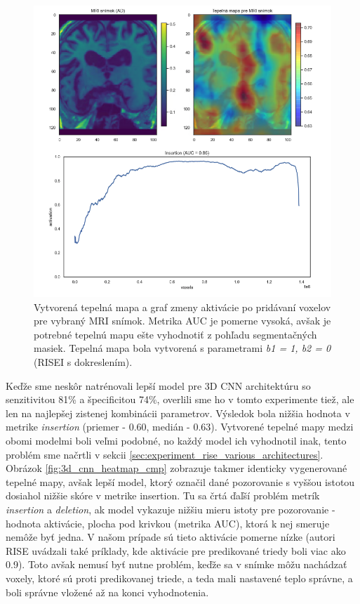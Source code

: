 \begin{figure}[h!]
    \centering
    \includegraphics[width=14cm]{assets/images/heatmap_and_auc_example.png}
    \caption{Vytvorená tepelná mapa a graf zmeny aktivácie po pridávaní voxelov pre vybraný MRI snímok. Metrika AUC je pomerne vysoká, avšak je potrebné tepelnú mapu ešte vyhodnotiť z pohľadu segmentačných masiek. Tepelná mapa bola vytvorená s parametrami \textit{b1 = 1, b2 = 0} (RISEI s dokreslením).}
    \label{fig:heatmap_and_auc_example}
\end{figure}

Keďže sme neskôr natrénovali lepší model pre 3D CNN architektúru so senzitivitou 81\% a špecificitou 74\%, overlili sme ho v tomto experimente tiež, ale len na najlepšej zistenej kombinácii parametrov. Výsledok bola nižšia hodnota v metrike \textit{insertion} (priemer - 0.60, medián - 0.63). Vytvorené tepelné mapy medzi obomi modelmi boli veľmi podobné, no každý model ich vyhodnotil inak, tento problém sme načrtli v sekcii \ref{sec:experiment_rise_various_architectures}. Obrázok \ref{fig:3d_cnn_heatmap_cmp} zobrazuje takmer identicky vygenerované tepelné mapy, avšak lepší model, ktorý označil dané pozorovanie s vyššou istotou 
dosiahol nižšie skóre v metrike insertion. Tu sa črtá ďaľší problém metrík \textit{insertion} a \textit{deletion}, ak model vykazuje nižšiu mieru istoty pre pozorovanie - hodnota aktivácie, plocha pod krivkou (metrika AUC), ktorá k nej smeruje nemôže byť jedna. V našom prípade sú tieto aktivácie pomerne nízke (autori RISE uvádzali také príklady, kde aktivácie pre predikované triedy boli viac ako 0.9). Toto avšak nemusí byť nutne problém, keďže sa v snímke môžu nachádzať voxely, ktoré sú proti predikovanej triede, a teda mali nastavené teplo správne, a boli správne vložené až na konci vyhodnotenia. 

